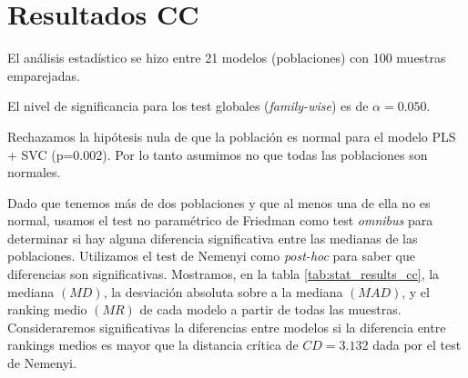 \documentclass[a4paper,oneside,11pt,leqno]{article}
\begin{document}
	\section{Resultados CC}
	\label{sec:results_cc}

	El análisis estadístico se hizo entre 21 modelos (poblaciones) con 100 muestras emparejadas.

	El nivel de significancia para los test globales (\textit{family-wise}) es de $\alpha=0.050$.

	Rechazamos la hipótesis nula de que la población es normal para el modelo PLS + SVC (p=0.002). Por lo tanto asumimos no que todas las poblaciones son normales.

	Dado que tenemos más de dos poblaciones y que al menos una de ella no es normal, usamos el test no paramétrico de Friedman como test \textit{omnibus} para determinar si hay alguna diferencia significativa entre las medianas de las poblaciones. Utilizamos el test de Nemenyi como \textit{post-hoc} para saber que diferencias son significativas. Mostramos, en la tabla \ref{tab:stat_results_cc}, la mediana $(MD)$, la desviación absoluta sobre a la mediana $(MAD)$, y el ranking medio $(MR)$ de cada modelo a partir de todas las muestras. Consideraremos significativas la diferencias entre modelos si la diferencia entre rankings medios es mayor que la distancia crítica de $CD=3.132$ dada por el test de Nemenyi.
\end{document}
